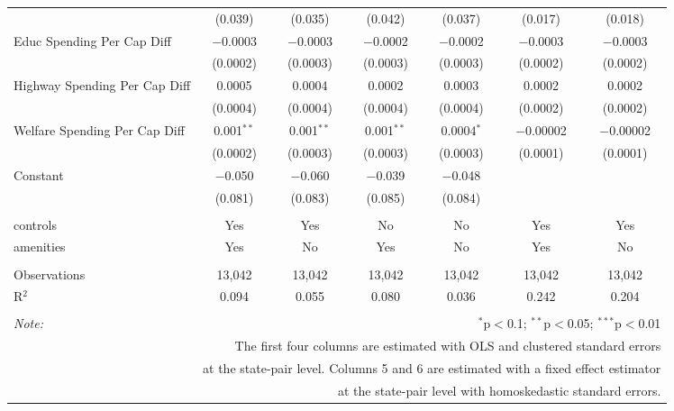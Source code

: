 \begin{table}[!htbp]
\begin{tabular}{@{\extracolsep{5pt}}lcccccc}
  & (0.039) & (0.035) & (0.042) & (0.037) & (0.017) & (0.018) \\ 
  Educ Spending Per Cap Diff & $-$0.0003 & $-$0.0003 & $-$0.0002 & $-$0.0002 & $-$0.0003 & $-$0.0003 \\ 
  & (0.0002) & (0.0003) & (0.0003) & (0.0003) & (0.0002) & (0.0002) \\ 
  Highway Spending Per Cap Diff & 0.0005 & 0.0004 & 0.0002 & 0.0003 & 0.0002 & 0.0002 \\ 
  & (0.0004) & (0.0004) & (0.0004) & (0.0004) & (0.0002) & (0.0002) \\ 
  Welfare Spending Per Cap Diff & 0.001$^{**}$ & 0.001$^{**}$ & 0.001$^{**}$ & 0.0004$^{*}$ & $-$0.00002 & $-$0.00002 \\ 
  & (0.0002) & (0.0003) & (0.0003) & (0.0003) & (0.0001) & (0.0001) \\ 
  Constant & $-$0.050 & $-$0.060 & $-$0.039 & $-$0.048 &  &  \\ 
  & (0.081) & (0.083) & (0.085) & (0.084) &  &  \\ 
 \hline \\[-1.8ex] 
controls & Yes & Yes & No & No & Yes & Yes \\ 
amenities & Yes & No & Yes & No & Yes & No \\ 
\hline \\[-1.8ex] 
Observations & 13,042 & 13,042 & 13,042 & 13,042 & 13,042 & 13,042 \\ 
R$^{2}$ & 0.094 & 0.055 & 0.080 & 0.036 & 0.242 & 0.204 \\ 
\hline 
\hline \\[-1.8ex] 
\textit{Note:}  & \multicolumn{6}{r}{$^{*}$p$<$0.1; $^{**}$p$<$0.05; $^{***}$p$<$0.01} \\ 
 & \multicolumn{6}{r}{The first four columns are estimated with OLS and clustered standard errors} \\ 
 & \multicolumn{6}{r}{at the state-pair level. Columns 5 and 6 are estimated with a fixed effect estimator} \\ 
 & \multicolumn{6}{r}{at the state-pair level with homoskedastic standard errors.} \\ 
\end{tabular} 
\end{table} 
